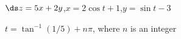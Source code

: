 {$\ds z=5x+2y$,\qquad $x=2\cos t+1$,\qquad $y=\sin t-3$
}
{$t=\tan^{-1}(1/5) +n\pi$, where $n$ is an integer
	
}
